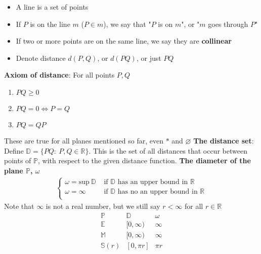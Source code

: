 \documentclass{report}
\begin{document}
\begin{itemize}
        \begin{itemize}
            \item A line is a set of points
            \item If $P$ is on the line $m$ ($P\in m$), we say that "$P$ is on $m$", or "$m$ goes through $P$"
            \item If two or more points are on the same line, we say they are \textbf{collinear}
            \item Denote distance $d(P,Q)$, or $d(PQ)$, or just $PQ$
        \end{itemize}
        \bigbreak \noindent 
        \textbf{Axiom of distance}: For all points $P,Q$
        \begin{enumerate}
            \item $PQ \geq 0 $
            \item $PQ = 0 \iff P=Q $
            \item $PQ = QP $
        \end{enumerate}
        These are true for all planes mentioned so far, even $*$ and $\varnothing $
        \bigbreak \noindent 
        \textbf{The distance set}: Define $\mathbb{D} = \{PQ:\ P,Q \in \mathbb{R}\}$. This is the set of all distances that occur between points of $\mathbb{P}$, with respect to the given distance function.
        \bigbreak \noindent 
        \textbf{The diameter of the plane $\mathbb{P}$, $\omega $}
        \begin{align*}
            \begin{cases}
                \omega = \text{sup}\ \mathbb{D} & \text{ if $\mathbb{D}$ has an upper bound in $\mathbb{R} $}      \\
                \omega = \infty & \text{ if $\mathbb{D}$ has no an upper bound in $\mathbb{R} $}      \\
            \end{cases}
        \end{align*}
        \bigbreak \noindent 
        Note that $\infty$ is not a real number, but we still say $r < \infty$ for all $r\in \mathbb{R} $
        \bigbreak \noindent 
        \[
            \begin{array}{|c|c|c|}
                \hline
                \mathbb{P} & \mathbb{D} & \omega \\
                \hline
                \mathbb{E} & [0, \infty) & \infty \\
                \mathbb{M} & [0, \infty) & \infty \\
                \mathbb{S}(r) & [0, \pi r] & \pi r \\

\end{array}\]
\end{itemize}
\end{document}
